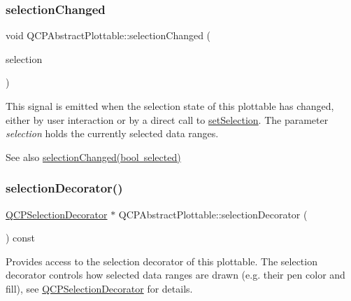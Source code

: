 \subsubsection{\texorpdfstring{selectionChanged}{selectionChanged}\hspace{0.1cm}{\footnotesize\ttfamily [2/2]}}
{\footnotesize\ttfamily void Q\+C\+P\+Abstract\+Plottable\+::selection\+Changed (\begin{DoxyParamCaption}\item[{const \mbox{\hyperlink{class_q_c_p_data_selection}{Q\+C\+P\+Data\+Selection}} \&}]{selection }\end{DoxyParamCaption})\hspace{0.3cm}{\ttfamily [signal]}}

This signal is emitted when the selection state of this plottable has changed, either by user interaction or by a direct call to \mbox{\hyperlink{class_q_c_p_abstract_plottable_a219bc5403a9d85d3129165ec3f5ae436}{set\+Selection}}. The parameter {\itshape selection} holds the currently selected data ranges.

\begin{DoxySeeAlso}{See also}
\mbox{\hyperlink{class_q_c_p_abstract_plottable_a3af66432b1dca93b28e00e78a8c7c1d9}{selection\+Changed(bool selected)}} 
\end{DoxySeeAlso}
\mbox{\label{class_q_c_p_abstract_plottable_a7861518e47ca0c6a0c386032c2db075e}} 
\subsubsection{\texorpdfstring{selectionDecorator()}{selectionDecorator()}}
{\footnotesize\ttfamily \mbox{\hyperlink{class_q_c_p_selection_decorator}{Q\+C\+P\+Selection\+Decorator}} $\ast$ Q\+C\+P\+Abstract\+Plottable\+::selection\+Decorator (\begin{DoxyParamCaption}{ }\end{DoxyParamCaption}) const\hspace{0.3cm}{\ttfamily [inline]}}

Provides access to the selection decorator of this plottable. The selection decorator controls how selected data ranges are drawn (e.\+g. their pen color and fill), see \mbox{\hyperlink{class_q_c_p_selection_decorator}{Q\+C\+P\+Selection\+Decorator}} for details.

